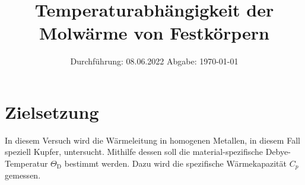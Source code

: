 

\subject{V47}
\title{Temperaturabhängigkeit der Molwärme von Festkörpern}
\date{
    Durchführung: 08.06.2022
     \hspace{3em}
    Abgabe: \today %
}


\maketitle
\thispagestyle{empty}
\tableofcontents
\newpage

\section{Zielsetzung}

    In diesem Versuch wird die Wärmeleitung in homogenen Metallen,
    in diesem Fall speziell Kupfer,
    untersucht.
    Mithilfe dessen soll die material-spezifische Debye-Temperatur $\Theta_\text{D}$ bestimmt werden.
    Dazu wird die spezifische Wärmekapazität $C_p$ gemessen.


\clearpage


\clearpage


\clearpage


\clearpage

\printbibliography


